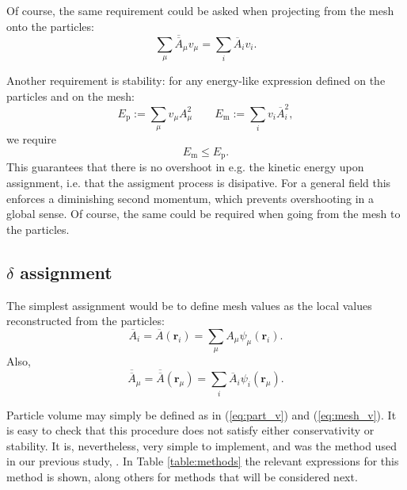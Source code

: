 \documentclass{ws-ijcm}
\newcommand{\bfr}{\mathbf{r}}
\newcommand*{\Ab}{\overline{A}}
\newcommand*{\Abb}{\overline{\overline{A}}}
\begin{document}
Of course, the same requirement could be asked when projecting from the
mesh onto the particles:
\begin{equation}
\label{eq:cons2}
\sum_\mu \Abb_\mu v_\mu  = \sum_i \Ab_i v_i .
\end{equation}

Another requirement is stability: for any energy-like expression
defined on the particles and on the mesh:
\[
E_\mathrm{p} := \sum_\mu v_\mu A_\mu^2 \qquad
E_\mathrm{m} := \sum_i v_i \Ab_i^2 ,
\]
we require
\begin{equation}
\label{eq:stab}
E_\mathrm{m} \le E_\mathrm{p} .
\end{equation}
This guarantees that there is no overshoot in e.g. the kinetic energy
upon assignment, i.e. that the assigment process is disipative.  For a
general field this enforces a diminishing second momentum, which
prevents overshooting in a global sense. Of course, the same could be
required when going from the mesh to the particles.

\subsection{$\delta$ assignment}
\label{sec:delta_assignment}

The simplest assignment would be to define mesh values as the local
values reconstructed from the particles:
\begin{equation}
\label{eq:delta}
\Ab_i = \Ab(\bfr_i) = \sum_\mu A_\mu \psi_\mu( \bfr_i ) .
\end{equation}
Also,
\begin{equation}
\label{eq:delta2}
\Abb_\mu = \Abb(\bfr_\mu) = \sum_i \Ab_i \psi_i( \bfr_\mu ) .
\end{equation}

Particle volume may simply be defined as in (\ref{eq:part_v}) and
(\ref{eq:mesh_v}). It is easy to check that this procedure does not
satisfy either conservativity or stability.  It is, nevertheless, very
simple to implement, and was the method used in our previous study,
\cite{duque_2017b}. In Table \ref{table:methods} the relevant
expressions for this method is shown, along others for methods that
will be considered next.
\end{document}
